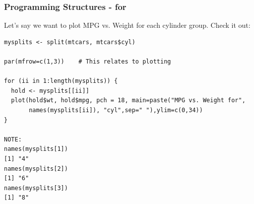 \documentclass{beamer}
\begin{document}
%
%
%
%

%

\begin{frame}[fragile]
\frametitle{Programming Structures - for }
Let's say we want to plot MPG vs. Weight for each cylinder group. Check it out:
\footnotesize
\begin{verbatim}
mysplits <- split(mtcars, mtcars$cyl)

par(mfrow=c(1,3))    # This relates to plotting

for (ii in 1:length(mysplits)) {
  hold <- mysplits[[ii]]
  plot(hold$wt, hold$mpg, pch = 18, main=paste("MPG vs. Weight for",
       names(mysplits[ii]), "cyl",sep=" "),ylim=c(0,34))
}

NOTE:
names(mysplits[1])
[1] "4"
names(mysplits[2])
[1] "6"
names(mysplits[3])
[1] "8"

\end{verbatim}
\end{frame}

%
\end{document}
